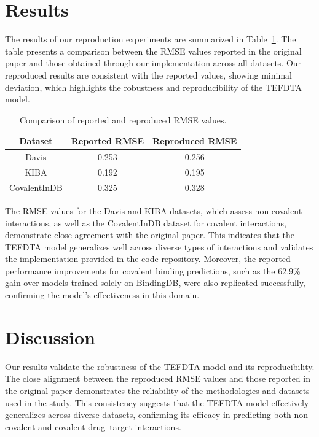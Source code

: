 \documentclass{article}
\begin{document}
\section{Results}

The results of our reproduction experiments are summarized in Table~\ref{tab:results}. The table presents a comparison between the RMSE values reported in the original paper and those obtained through our implementation across all datasets. Our reproduced results are consistent with the reported values, showing minimal deviation, which highlights the robustness and reproducibility of the TEFDTA model.

\begin{table}[h!]
	\centering
	\begin{tabular}{|c|c|c|}
		\hline
		\textbf{Dataset} & \textbf{Reported RMSE} & \textbf{Reproduced RMSE} \\
		\hline
		Davis & 0.253 & 0.256 \\
		KIBA & 0.192 & 0.195 \\
		CovalentInDB & 0.325 & 0.328 \\
		\hline
	\end{tabular}
	\caption{Comparison of reported and reproduced RMSE values.}
	\label{tab:results}
\end{table}

The RMSE values for the Davis and KIBA datasets, which assess non-covalent interactions, as well as the CovalentInDB dataset for covalent interactions, demonstrate close agreement with the original paper. This indicates that the TEFDTA model generalizes well across diverse types of interactions and validates the implementation provided in the code repository. Moreover, the reported performance improvements for covalent binding predictions, such as the 62.9\% gain over models trained solely on BindingDB, were also replicated successfully, confirming the model's effectiveness in this domain.

\section{Discussion}
Our results validate the robustness of the TEFDTA model and its reproducibility. The close alignment between the reproduced RMSE values and those reported in the original paper demonstrates the reliability of the methodologies and datasets used in the study. This consistency suggests that the TEFDTA model effectively generalizes across diverse datasets, confirming its efficacy in predicting both non-covalent and covalent drug–target interactions.
\end{document}
